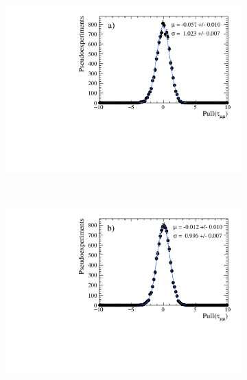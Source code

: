 \begin{figure}[tbp]
    \centering
   \begin{subfigure}[b]{0.48\textwidth}
        \includegraphics[width= \textwidth]{./Figs/LifetimeMeasurement/50fb_simple_tau_pull.pdf}
    \end{subfigure}
   ~ %
    \begin{subfigure}[b]{0.48\textwidth}
       \includegraphics[width=\textwidth]{./Figs/LifetimeMeasurement/300fb_simple_tau_pull.pdf}

\end{subfigure}
\end{figure}
